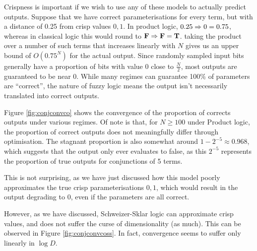 Crispness is important if we wish to use any of these models to actually predict outputs. Suppose that we have correct parameterisations for every term, but with a distance of 0.25 from crisp values $0, 1$. In product logic, $0.25 \Rightarrow 0 = 0.75$, whereas in classical logic this would round to $\textbf{F} \Rightarrow \textbf{F} = \textbf{T}$. taking the product over a number of such terms that increases linearly with $N$ gives us an upper bound of $O(0.75^N)$ for the actual output. Since randomly sampled input bits generally have a proportion of bits with value $0$ close to $\frac{N}{2}$, most outputs are guaranteed to be near $0$. While many regimes can guarantee 100\% of parameters are ``correct'', the nature of fuzzy logic means the output isn't necessarily translated into correct outputs.

Figure \ref{fig:conjconvco} shows the convergence of the proportion of corrects outputs under various regimes. Of note is that, for $N \geq 100$ under Product logic, the proportion of correct outputs does not meaningfully differ through optimisation. The stagnant proportion is also somewhat around $1 - 2^{-5} \approx 0.968$, which suggests that the output only ever evaluates to false, as this $2^{-5}$ represents the proportion of true outputs for conjunctions of 5 terms. 

This is not surprising, as we have just discussed how this model poorly approximates the true crisp parameterisations $0,1$, which would result in the output degrading to $0$, even if the parameters are all correct.

However, as we have discussed, Schweizer-Sklar logic can approximate crisp values, and does not suffer the curse of dimensionality (as much). This can be observed in Figure \ref{fig:conjconvcoss}. In fact, convergence seems to suffer only linearly in $\log D$.

